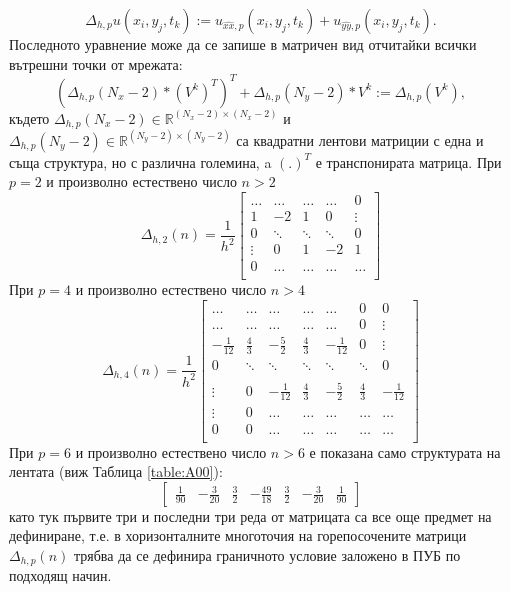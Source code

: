 \documentclass{article}
\newcommand{\be}{\begin{equation}}
\newcommand{\ee}{\end{equation}}
\newcommand{\RR}{\mathbb{R}}
\begin{document}
\be\label{deltaHSingle}
\Delta_{h,p} u(x_i, y_j, t_k) :=  u_{\widehat{xx},p}(x_i, y_j, t_k) + u_{\widehat{yy},p}(x_i, y_j, t_k).
\ee
Последното уравнение може да се запише в матричен вид отчитайки всички вътрешни точки от мрежата:
\be\label{DeltaH}
\left( \Delta_{h,p}(N_x-2)*(V^k)^T\right)^T + \Delta_{h,p}(N_y-2)*V^k := \Delta_{h,p} (V^k) ,
\ee
където $\Delta_{h,p}(N_x-2) \in \RR^{(N_x-2) \times (N_x-2)}$ и $\Delta_{h,p}(N_y-2) \in \RR^{(N_y-2) \times (N_y-2)}$ са квадратни лентови матриции с една и съща структура, но с различна големина, a $(.)^T$ е транспонирата матрица. При $p=2$ и произволно естествено число $n>2$ 
\[
\Delta_{h,2}(n) = \frac{1}{h^2}
\begin{bmatrix}
    \dots       & \dots        &     \dots   &   \dots        & 0   \\
    1               & -2            &   1           &   0               & \vdots    \\
        0           & \ddots        &    \ddots    &   \ddots       &  0 \\ 
    \vdots       &     0            &  1     	& -2    	   & 1 \\
    0               & \dots          &  \dots         & \dots  	   & \dots \\
\end{bmatrix}
\]
При $p=4$ и произволно естествено число $n>4$ 
\[
\Delta_{h,4}(n) = \frac{1}{h^2}
\begin{bmatrix}
    \dots		& \dots            	& \dots		&   		 \dots  &    \dots      	   &   0           & 0    \\
    \dots    	           &\dots            	& \dots		&   		\dots   &   \dots      	   	   &   0	           & \vdots  \\
    -\frac{1}{12}	& \frac{4}{3}         	& -\frac{5}{2}	&  \frac{4}{3}    	 &   -\frac{1}{12}	  &      0           &\vdots    \\
        0           		& \ddots        	&    \ddots   		 &   \ddots      	 &     \ddots      	  &  \ddots        &    0 \\	
\\
   \vdots      		 & 0           		 &  -\frac{1}{12}	& \frac{4}{3}    	& -\frac{5}{2}	&  \frac{4}{3}  &   -\frac{1}{12} \\
    \vdots    		 & 0        		 &	 \dots     	&  \dots              	&\dots 		 &  \dots 	&\dots   	\\
    0              		 & 0        		 &	 \dots     	&  \dots             	 &\dots 		 &  \dots 	&\dots 	\\
\end{bmatrix}
\]
При $p=6$ и произволно естествено число $n>6$ е показана само структурата на лентата  (виж Таблица \ref{table:A00}):
\[
\begin{bmatrix}
    \frac{1}{90}	& -\frac{3}{20}	& \frac{3}{2}         	& -\frac{49}{18}	&  \frac{3}{2}    	 &   -\frac{3}{20}	  &      \frac{1}{90}
\end{bmatrix}
\]
като тук първите три и последни три реда от матрицата са все още предмет на дефиниране, т.е. в хоризонталните многоточия на горепосочените матрици $\Delta_{h,p}(n)$ трябва да се дефинира граничното условие заложено в ПУБ по подходящ начин.
\end{document}
